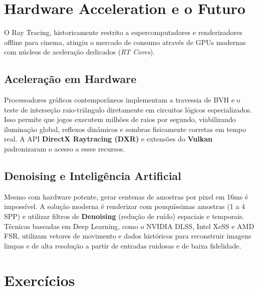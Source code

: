 \section{Hardware Acceleration e o Futuro}

O Ray Tracing, historicamente restrito a supercomputadores e renderizadores offline para cinema, atingiu o mercado de consumo através de GPUs modernas com núcleos de aceleração dedicados (\textit{RT Cores}).

\subsection{Aceleração em Hardware}

Processadores gráficos contemporâneos implementam a travessia de BVH e o teste de interseção raio-triângulo diretamente em circuitos lógicos especializados. Isso permite que jogos executem milhões de raios por segundo, viabilizando iluminação global, reflexos dinâmicos e sombras fisicamente corretas em tempo real. A API \textbf{DirectX Raytracing (DXR)} e extensões do \textbf{Vulkan} padronizaram o acesso a esses recursos.

\subsection{Denoising e Inteligência Artificial}

Mesmo com hardware potente, gerar centenas de amostras por pixel em 16ms é impossível. A solução moderna é renderizar com pouquíssimas amostras (1 a 4 SPP) e utilizar filtros de \textbf{Denoising} (redução de ruído) espaciais e temporais. Técnicas baseadas em Deep Learning, como o NVIDIA DLSS, Intel XeSS e AMD FSR, utilizam vetores de movimento e dados históricos para reconstruir imagens limpas e de alta resolução a partir de entradas ruidosas e de baixa fidelidade.

\section*{Exercícios}

